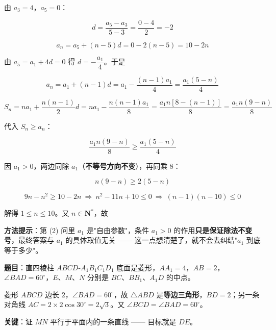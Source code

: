 由 $a_3=4$，$a_5=0$：

\[d=\frac{a_5-a_3}{5-3}=\frac{0-4}2=-2\]

\[a_n=a_5+(n-5)d=0-2(n-5)=10-2n\]



由 $a_5=a_1+4d=0$ 得 $d=-\dfrac{a_1}4$。于是

\[a_n=a_1+(n-1)d=a_1-\frac{(n-1)a_1}4=\frac{a_1(5-n)}4\]

\[S_n=na_1+\frac{n(n-1)}2d=na_1-\frac{n(n-1)a_1}8=\frac{a_1n\left[8-(n-1)\right]}8=\frac{a_1n(9-n)}8\]

代入 $S_n\ge a_n$：

\[\frac{a_1n(9-n)}8\ge\frac{a_1(5-n)}4\]

因 $a_1>0$，两边同除 $a_1$（\textbf{不等号方向不变}），再同乘 $8$：

\[n(9-n)\ge2(5-n)\]

\[9n-n^{2}\ge10-2n\ \Longrightarrow\ n^{2}-11n+10\le0\ \Longrightarrow\ (n-1)(n-10)\le0\]

解得 $1\le n\le10$。又 $n\in\mathbf N^{*}$，故


\begin{gktip}
\textbf{方法提示}：第 (2) 问里 $a_1$ 是"自由参数"，条件 $a_1>0$ 的作用\textbf{只是保证除法不变号}，最终答案与 $a_1$ 的具体取值无关 —— 这一点想清楚了，就不会去纠结"$a_1$ 到底等于多少"。
\end{gktip}

\par\medskip


\textbf{题目}：直四棱柱 $ABCD\text{-}A_1B_1C_1D_1$ 底面是菱形，$AA_1=4$，$AB=2$，$\angle BAD=60^\circ$，$E$、$M$、$N$ 分别是 $BC$、$BB_1$、$A_1D$ 的中点。

\begin{center}\end{center}


菱形 $ABCD$ 边长 $2$，$\angle BAD=60^\circ$，故 $\triangle ABD$ 是\textbf{等边三角形}，$BD=2$；另一条对角线 $AC=2\times2\cos30^\circ=2\sqrt3$。又 $\angle BCD=\angle BAD=60^\circ$。


\textbf{关键}：证 $MN$ 平行于平面内的一条直线 —— 目标就是 $DE$。

